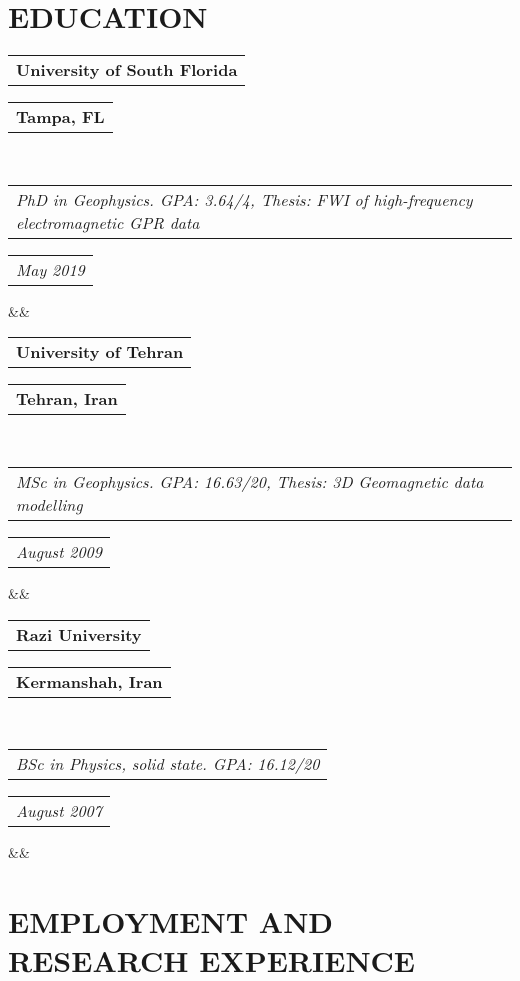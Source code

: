 \documentclass[11pt,a4paper,roman]{moderncv}        %
\makeatletter
\newcommand*{\customcventry}[7][.25em]{
	\begin{tabular}{@{}l} 
		{\bfseries #4}
	\end{tabular}
	\hfill%
	\begin{tabular}{l@{}}
		{\bfseries #5}
	\end{tabular} \\
	\begin{tabular}{@{}l} 
		{\itshape #3}
	\end{tabular}
	\hfill%
	\begin{tabular}{l@{}}
		{\itshape #2}
	\end{tabular}
	\ifx&#7&%
	\else{\\%
		\begin{minipage}{\maincolumnwidth}%
			\small#7%
	\end{minipage}}\fi%
	\par\addvspace{#1}}
\makeatother
\begin{document}
	
	\section{EDUCATION}
{\customcventry{May 2019}{PhD in Geophysics. GPA: 3.64/4, Thesis: FWI of high-frequency electromagnetic GPR data}{University of South Florida}{Tampa, FL}{}{}}

{\customcventry{August 2009}{MSc in Geophysics. GPA: 16.63/20, Thesis: 3D Geomagnetic data modelling}{University of Tehran}{Tehran, Iran}{}{}}

{\customcventry{August 2007}{BSc in Physics, solid state. GPA: 16.12/20}{Razi University}{Kermanshah, Iran}{}{}}
	
	
		
		\section{EMPLOYMENT AND RESEARCH EXPERIENCE}
		
\end{document}
